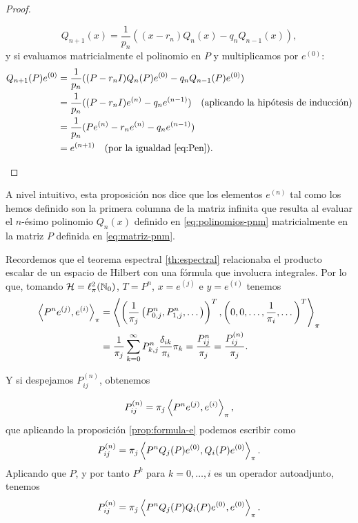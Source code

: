\begin{proof}
\begin{itemize}
            $$
            Q_{n+1}(x) = \dfrac{1}{p_n}((x-r_n)Q_n(x)-q_n Q_{n-1}(x)),
            $$
            y si evaluamos matricialmente el polinomio en $P$ y multiplicamos por $e^{(0)}$:
            \begin{equation*}
                \begin{split}
                    Q_{n+1}(P)e^{(0)} &= \dfrac{1}{p_n}((P-r_n I)Q_n(P)e^{(0)}-q_n Q_{n-1}(P)e^{(0)}) \\
                    &= \dfrac{1}{p_n}((P-r_n I)e^{(n)}-q_n e^{(n-1)}) \ \  \ \text{(aplicando la hipótesis de inducción)} \\
                    &= \dfrac{1}{p_n}(Pe^{(n)} -r_n e^{(n)}-q_n e^{(n-1)}) \\
                    &= e^{(n+1)} \ \ \ \text{(por la igualdad \eqref{eq:Pen})}.
                \end{split}
            \end{equation*}
        \end{itemize}
    \end{proof}

    A nivel intuitivo, esta proposición nos dice que los elementos $e^{(n)}$ tal como los hemos definido son la primera columna de la matriz infinita que resulta al evaluar el $n$-ésimo polinomio $Q_n(x)$ definido en \eqref{eq:polinomios-pnm} matricialmente en la matriz $P$ definida en \eqref{eq:matriz-pnm}.

    Recordemos que el teorema espectral \ref{th:espectral} relacionaba el producto escalar de un espacio de Hilbert con una fórmula que involucra integrales. Por lo que, tomando $\mathcal{H}=\ell^2_\pi(\mathbb{N}_0)$, $T=P^n$, $x=e^{(j)}$ e $y=e^{(i)}$ tenemos
    \begin{equation*}
        \begin{split}
            \left\langle P^n e^{(j)} , e^{(i)} \right\rangle_\pi &= \left\langle \left(\dfrac{1}{\pi_j}\left(P^n_{0,j},P^n_{1,j},\dots\right)\right)^T , \left(0,0,\dots, \dfrac{1}{\pi_i},\dots \right)^T \right\rangle_\pi \\
            &= \dfrac{1}{\pi_j} \sum_{k=0}^\infty P^n_{k,j} \dfrac{\delta_{ik}}{\pi_i}\pi_k = \dfrac{P^n_{ij}}{\pi_j}=\dfrac{P^{(n)}_{ij}}{\pi_j}.
        \end{split}
    \end{equation*}

    Y si despejamos $P^{(n)}_{ij}$, obtenemos

    \begin{equation*}
        P^{(n)}_{ij} = \pi_j \left\langle P^n e^{(j)} , e^{(i)} \right\rangle_\pi,
    \end{equation*}
    que aplicando la proposición \ref{prop:formula-e} podemos escribir como
    \begin{equation*}
        P^{(n)}_{ij} = \pi_j \left\langle P^n Q_j(P)e^{(0)} , Q_{i}(P)e^{(0)} \right\rangle_\pi.
    \end{equation*}
    Aplicando que $P$, y por tanto $P^k$ para $k=0,\dots,i$ es un operador autoadjunto, tenemos
    \begin{equation*}
        P^{(n)}_{ij} = \pi_j \left\langle P^n Q_j(P)Q_{i}(P)e^{(0)} , e^{(0)} \right\rangle_\pi.
    \end{equation*}

